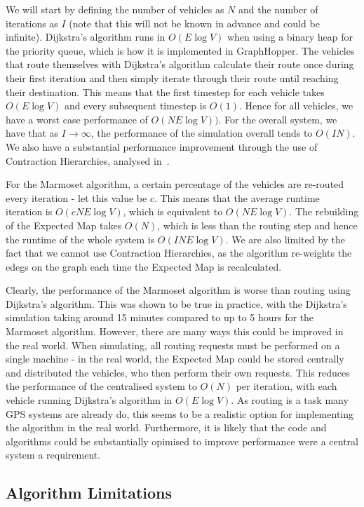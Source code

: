 \documentclass[ %
                    author={Alexander Hill},
                supervisor={Dr. Benjamin Sach},
                    degree={MEng},
                     title={MARMOSET},
                  subtitle={Multi-Agent Route Management using Online Simulation for Efficient Transportation},
                      type={research},
                      year={2016} ]{dissertation}
\begin{document}
We will start by defining the number of vehicles as $N$ and the number of
iterations as $I$ (note that this will not be known in advance and could be
infinite). Dijkstra's algorithm runs in $O(E \log V)$ when using a binary heap for the
priority queue, which is how it is implemented in GraphHopper. The vehicles that
route themselves with Dijkstra's algorithm calculate their route once during
their first iteration and then simply iterate through their route until reaching
their destination. This means that the first timestep for each vehicle takes
$O(E\log V)$ and every subsequent timestep is $O(1)$. Hence for all vehicles, we
have a worst case performance of $O(NE\log V))$. For the overall system, we
have that as $I \rightarrow \infty$, the performance of the simulation overall
tends to $O(IN)$. We also have a substantial performance improvement through the
use of Contraction Hierarchies, analysed in~\cite{ch-complexity}.

For the Marmoset algorithm, a certain percentage of the vehicles are re-routed
every iteration - let this value be $c$. This means that the average runtime
iteration is $O(cNE\log V)$, which is equivalent to $O(NE \log V)$. The
rebuilding of the Expected Map takes $O(N)$, which is less than the routing step
and hence the runtime of the whole system is $O(INE\log V)$. We are also
limited by the fact that we cannot use Contraction Hierarchies, as the algorithm
re-weights the edegs on the graph each time the Expected Map is recalculated.

Clearly, the performance of the Marmoset algorithm is worse than routing using
Dijkstra's algorithm. This was shown to be true in practice, with the Dijkstra's
simulation taking around 15 minutes compared to up to 5 hours for the Marmoset
algorithm. However, there are many ways this could be improved in the real
world. When simulating, all routing requests must be performed on a single
machine - in the real world, the Expected Map could be stored centrally and
distributed the vehicles, who then perform their own requests. This reduces the
performance of the centralised system to $O(N)$ per iteration, with each vehicle
running Dijkstra's algorithm in $O(E\log V)$. As routing is a task many GPS
systems are already do, this seems to be a realistic option for implementing the
algorithm in the real world. Furthermore, it is likely that the code and
algorithms could be substantially opimised to improve performance were a central
system a requirement.

\subsection{Algorithm Limitations}
\end{document}
